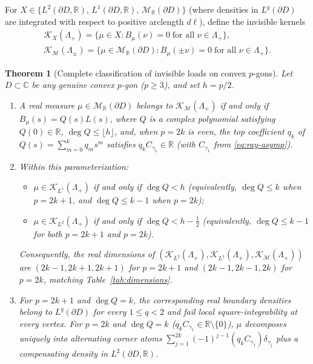 \documentclass[11pt,reqno]{amsart}
\newtheorem{theorem}{Theorem}[section]
\theoremstyle{definition}
\theoremstyle{remark}
\newcommand{\C}{\mathbb{C}}
\newcommand{\R}{\mathbb{R}}
\begin{document}
For $X \in \{L^2(\partial D, \R),\, L^1(\partial D, \R),\, \mathcal{M}_\R(\partial D)\}$ (where densities in $L^q(\partial D)$ are integrated with respect to positive arclength $d\ell$), define the invisible kernels
\begin{gather*}
  \mathcal{K}_X(\Lambda_+) = \bigl\{\mu \in X : B_\mu(\nu) = 0 \;\text{for all }\nu \in \Lambda_+\bigr\}, \\
  \mathcal{K}_{\mathcal{M}}(\Lambda_\pm) = \bigl\{\mu \in \mathcal{M}_\R(\partial D) : B_\mu(\pm\nu) = 0 \;\text{for all }\nu \in \Lambda_+\bigr\}.
\end{gather*}

\begin{theorem}[Complete classification of invisible loads on convex $p$-gons]\label{thm:invisible-table}
Let $D \subset \C$ be any genuine convex $p$-gon ($p \ge 3$), and set $h = p/2$.
\begin{enumerate}
  \item A real measure $\mu \in \mathcal{M}_\R(\partial D)$ belongs to $\mathcal{K}_{\mathcal{M}}(\Lambda_+)$ if and only if $B_\mu(s) = Q(s) L(s)$, where $Q$ is a complex polynomial satisfying $Q(0) \in \R$, $\deg Q \le \lfloor h \rfloor$, and, when $p = 2k$ is even, the top coefficient $q_k$ of $Q(s) = \sum_{m=0}^k q_m s^m$ satisfies $q_k C_{\gamma_1} \in \R$ (with $C_{\gamma_1}$ from \eqref{eq:ray-asymp}).
  \item Within this parameterization:
  \begin{itemize}
    \item $\mu \in \mathcal{K}_{L^1}(\Lambda_+)$ if and only if $\deg Q < h$ (equivalently, $\deg Q \le k$ when $p = 2k+1$, and $\deg Q \le k-1$ when $p = 2k$);
    \item $\mu \in \mathcal{K}_{L^2}(\Lambda_+)$ if and only if $\deg Q < h - \frac12$ (equivalently, $\deg Q \le k-1$ for both $p = 2k+1$ and $p = 2k$).
  \end{itemize}
  Consequently, the real dimensions of $(\mathcal{K}_{L^2}(\Lambda_+), \mathcal{K}_{L^1}(\Lambda_+), \mathcal{K}_{\mathcal{M}}(\Lambda_+))$ are $(2k-1, 2k+1, 2k+1)$ for $p = 2k+1$ and $(2k-1, 2k-1, 2k)$ for $p = 2k$, matching Table~\ref{tab:dimensions}.
  \item For $p = 2k+1$ and $\deg Q = k$, the corresponding real boundary densities belong to $L^q(\partial D)$ for every $1 \le q < 2$ and fail local square-integrability at every vertex. For $p = 2k$ and $\deg Q = k$ ($q_k C_{\gamma_1} \in \R \setminus \{0\}$), $\mu$ decomposes uniquely into alternating corner atoms $\sum_{j=1}^{2k} (-1)^{j-1} (q_k C_{\gamma_1}) \delta_{\gamma_j}$ plus a compensating density in $L^2(\partial D, \R)$.
\end{enumerate}
\end{theorem}
\end{document}
